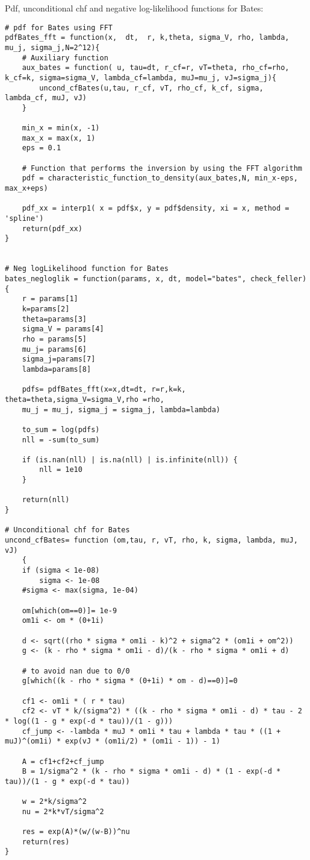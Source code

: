 \bigskip
\noindent
Pdf, unconditional chf and negative log-likelihood functions for Bates:
\begin{lstlisting}
# pdf for Bates using FFT
pdfBates_fft = function(x,  dt,  r, k,theta, sigma_V, rho, lambda, mu_j, sigma_j,N=2^12){
	# Auxiliary function
	aux_bates = function( u, tau=dt, r_cf=r, vT=theta, rho_cf=rho, k_cf=k, sigma=sigma_V, lambda_cf=lambda, muJ=mu_j, vJ=sigma_j){
		uncond_cfBates(u,tau, r_cf, vT, rho_cf, k_cf, sigma, lambda_cf, muJ, vJ)
	}
	
	min_x = min(x, -1)
	max_x = max(x, 1)
	eps = 0.1
	
	# Function that performs the inversion by using the FFT algorithm
	pdf = characteristic_function_to_density(aux_bates,N, min_x-eps, max_x+eps)
	
	pdf_xx = interp1( x = pdf$x, y = pdf$density, xi = x, method = 'spline')
	return(pdf_xx)
}
	
	
# Neg logLikelihood function for Bates
bates_negloglik = function(params, x, dt, model="bates", check_feller){
	r = params[1]
	k=params[2]
	theta=params[3]
	sigma_V = params[4]
	rho = params[5]
	mu_j= params[6]
	sigma_j=params[7]
	lambda=params[8]
	
	pdfs= pdfBates_fft(x=x,dt=dt, r=r,k=k, theta=theta,sigma_V=sigma_V,rho =rho,
	mu_j = mu_j, sigma_j = sigma_j, lambda=lambda)
	
	to_sum = log(pdfs)
	nll = -sum(to_sum)
	
	if (is.nan(nll) | is.na(nll) | is.infinite(nll)) {
		nll = 1e10
	}
	
	return(nll)
}
	
# Unconditional chf for Bates
uncond_cfBates= function (om,tau, r, vT, rho, k, sigma, lambda, muJ, vJ)
	{
	if (sigma < 1e-08)
		sigma <- 1e-08
	#sigma <- max(sigma, 1e-04)
	
	om[which(om==0)]= 1e-9
	om1i <- om * (0+1i)
	
	d <- sqrt((rho * sigma * om1i - k)^2 + sigma^2 * (om1i + om^2))
	g <- (k - rho * sigma * om1i - d)/(k - rho * sigma * om1i + d)
	
	# to avoid nan due to 0/0
	g[which((k - rho * sigma * (0+1i) * om - d)==0)]=0
	
	cf1 <- om1i * ( r * tau) 
	cf2 <- vT * k/(sigma^2) * ((k - rho * sigma * om1i - d) * tau - 2 * log((1 - g * exp(-d * tau))/(1 - g)))
	cf_jump <- -lambda * muJ * om1i * tau + lambda * tau * ((1 + muJ)^(om1i) * exp(vJ * (om1i/2) * (om1i - 1)) - 1)
	
	A = cf1+cf2+cf_jump
	B = 1/sigma^2 * (k - rho * sigma * om1i - d) * (1 - exp(-d * tau))/(1 - g * exp(-d * tau))
	
	w = 2*k/sigma^2
	nu = 2*k*vT/sigma^2
	
	res = exp(A)*(w/(w-B))^nu
	return(res)
}
\end{lstlisting}



